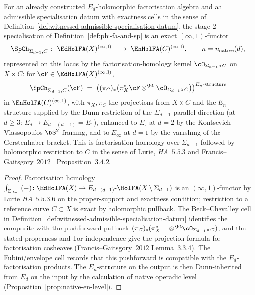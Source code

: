 \begin{proposition}
\label{prop:spch-infty1-kernel}
For an already constructed $E_d$-holomorphic factorisation algebra and an admissible specialisation datum with exactness cells in the sense of Definition~\ref{def:witnessed-admissible-specialisation-datum}, the stage-$2$ specialisation of Definition~\ref{def:phi-fa-and-sp} is an exact $(\infty,1)$-functor
\[
 \SpCh_{\Sigma_{d-1}, C} \;\colon\; \EdHolFA(X)^{(\infty,1)} \;\longrightarrow\; \EnHolFA(C)^{(\infty,1)},
 \qquad n = n_{\mathrm{native}}(d),
\]
represented on this locus by the factorisation-homology kernel $\cO_{\Sigma_{d-1} \times C}$ on $X \times C$: for $\cF \in \EdHolFA(X)^{(\infty,1)}$,
\[
 \SpCh_{\Sigma_{d-1}, C}(\cF) \;=\; \bigl((\pi_C)_*\bigl(\pi_X^* \cF \otimes^{\bL} \cO_{\Sigma_{d-1} \times C}\bigr)\bigr)^{E_n\text{-}\mathrm{structure}}
\]
in $\EnHolFA(C)^{(\infty,1)}$, with $\pi_X, \pi_C$ the projections from $X \times C$ and the $E_n$-structure supplied by the Dunn restriction of the $\Sigma_{d-1}$-parallel direction (at $d \geq 3$: $E_d \to E_{d - (d-1)} = E_1$), enhanced to $E_2$ at $d = 2$ by the Kontsevich--Vlassopoulos $\bS^2$-framing, and to $E_\infty$ at $d = 1$ by the vanishing of the Gerstenhaber bracket. This is factorisation homology over $\Sigma_{d-1}$ followed by holomorphic restriction to $C$ in the sense of Lurie, \textit{HA}~$5.5.3$ and Francis--Gaitsgory~$2012$~\cite{FrancisGaitsgory2012} Proposition~$3.4.2$.
\end{proposition}

\begin{proof}
Factorisation homology $\int_{\Sigma_{d-1}}(-) \colon \EdHolFA(X) \to E_{d - (d-1)}\text{-}\HolFA(X \setminus \Sigma_{d-1})$ is an $(\infty,1)$-functor by Lurie \textit{HA}~$5.5.3.6$ on the proper-support and exactness condition; restriction to a reference curve $C \subset X$ is exact by holomorphic pullback. The Beck--Chevalley cell in Definition~\ref{def:witnessed-admissible-specialisation-datum} identifies the composite with the pushforward-pullback
$(\pi_C)_*(\pi_X^* - \otimes^{\bL} \cO_{\Sigma_{d-1} \times C})$, and the stated properness and Tor-independence give the projection formula for factorisation cosheaves (Francis--Gaitsgory~$2012$ Lemma~$3.3.4$). The Fubini/envelope cell records that this pushforward is compatible with the $E_d$-factorisation products. The $E_n$-structure on the output is then Dunn-inherited from $E_d$ on the input by the calculation of native operadic level (Proposition~\ref{prop:native-en-level}).
\end{proof}

